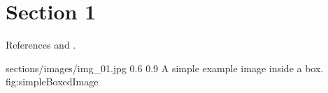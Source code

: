 \documentclass[../../../main.tex]{subfiles}
\begin{document}
\section{Section 1}
References \parencite{Ref01}  and \parencite{Ref02}.

\begin{centerBoxImageStyle}
    {sections/images/img_01.jpg}     
    {0.6\linewidth}                         
    {0.9\linewidth}                         
    {A simple example image inside a box.}  
    {fig:simpleBoxedImage}               
\end{centerBoxImageStyle}
\end{document}
